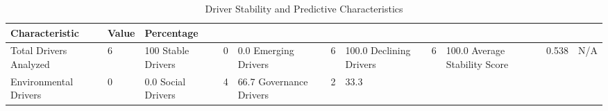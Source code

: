 \begin{table}
\caption{Driver Stability and Predictive Characteristics}
\label{tab:driver_characteristics}
\begin{tabular}{lll}
\toprule
Characteristic & Value & Percentage \\
\midrule
Total Drivers Analyzed & 6 & 100%
Stable Drivers & 0 & 0.0%
Emerging Drivers & 6 & 100.0%
Declining Drivers & 6 & 100.0%
Average Stability Score & 0.538 & N/A \\
Environmental Drivers & 0 & 0.0%
Social Drivers & 4 & 66.7%
Governance Drivers & 2 & 33.3%
\bottomrule
\end{tabular}
\end{table}
